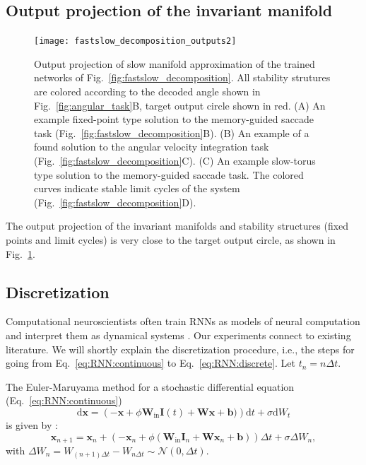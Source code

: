 \documentclass{article} %
\newcounter{ct}
\theoremstyle{definition}
\theoremstyle{remark}
\begin{document}
\subsection{Output projection of the invariant manifold}

\begin{figure}[tbhp]
  \centering
  \texttt{[image: fastslow\_decomposition\_outputs2]}
  \caption{Output projection of slow manifold approximation of the trained networks of Fig.~\ref{fig:fastslow_decomposition}. All stability strutures are colored according to the decoded angle shown in Fig.~\ref{fig:angular_task}B, target output circle shown in red.
 (A) An example fixed-point type solution to the memory-guided saccade task (Fig.~\ref{fig:fastslow_decomposition}B).
 (B) An example of a found solution to the angular velocity integration task (Fig.~\ref{fig:fastslow_decomposition}C).
 (C) An example slow-torus type solution to the memory-guided saccade task. The colored curves indicate stable limit cycles of the system (Fig.~\ref{fig:fastslow_decomposition}D).
}\label{fig:fastslow_decomposition_otuput}
\end{figure}

The output projection of the invariant manifolds and stability structures (fixed points and limit cycles) is very close to the target output circle, as shown in Fig.~\ref{fig:fastslow_decomposition_otuput}.



\subsection{Discretization}\label{sec:discretization}
Computational neuroscientists often train RNNs as models of neural computation and interpret them as dynamical systems \citep{mante2013context,sussillo2013blackbox}.
Our experiments connect to existing literature.
We will shortly explain the discretization procedure, i.e., the steps for going from Eq.~\ref{eq:RNN:continuous} to Eq.~\ref{eq:RNN:discrete}.
Let $t_n = n \Delta t$.

The Euler-Maruyama method for a stochastic differential equation (Eq.~\ref{eq:RNN:continuous})
\[\mathrm{d}{\mathbf{x}} = \left(-\mathbf{x} + \phi\mathbf{W}_{\text{in}} \mathbf{I}(t) + \mathbf{W} \mathbf{x} + \mathbf{b})\right)\mathrm{d}{t} + \sigma\mathrm{d}{W}_t\] is given by :
\[\mathbf{x}_{n+1} = \mathbf{x}_n + \left( -\mathbf{x}_n + \phi(\mathbf{W}_{\text{in}} \mathbf{I}_n + \mathbf{W} \mathbf{x}_n + \mathbf{b}) \right) \Delta t + \sigma \Delta W_n,\]
with \(\Delta W_{n}=W_{(n+1)\Delta t}-W_{n\Delta t}\sim \mathcal{N}(0,\Delta t).\)
\end{document}
